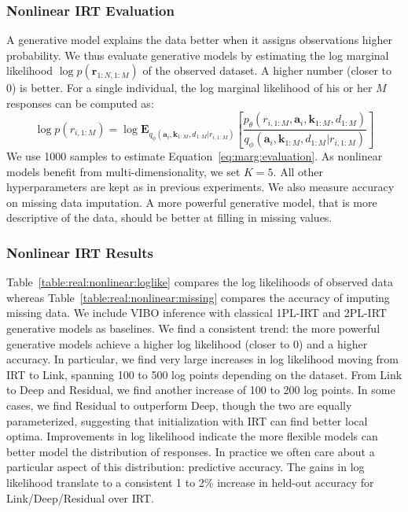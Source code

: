 \subsubsection{Nonlinear IRT Evaluation}

A generative model explains the data better when it assigns observations higher probability.
We thus evaluate generative models by estimating the log marginal likelihood $\log p(\textbf{r}_{1:N,1:M})$ of the observed dataset.
A higher number (closer to 0) is better.
For a single individual, the log marginal likelihood of his or her $M$ responses can be computed as:
\begin{equation}
    \log p({r}_{i,1:M}) = \log \mathbf{E}_{q_\phi(\textbf{a}_i, \textbf{k}_{1:M}, d_{1:M}|{r}_{i,1:M})}\left[ \frac{p_\theta({r}_{i,1:M}, \textbf{a}_i, \textbf{k}_{1:M}, d_{1:M})}{q_\phi(\textbf{a}_i, \textbf{k}_{1:M}, d_{1:M}|{r}_{i,1:M})} \right]
    \label{eq:marg:evaluation}
\end{equation}
We use 1000 samples to estimate Equation~\ref{eq:marg:evaluation}. 
As nonlinear models benefit from multi-dimensionality, we set $K=5$. All other hyperparameters are kept as in previous experiments.
We also measure accuracy on missing data imputation.
A more powerful generative model, that is more descriptive of the data, should be better at filling in missing values.

\subsubsection{Nonlinear IRT Results}
Table~\ref{table:real:nonlinear:loglike} compares the log likelihoods of observed data whereas Table~\ref{table:real:nonlinear:missing} compares the accuracy of imputing missing data.
We include VIBO inference with classical 1PL-IRT and 2PL-IRT generative models as baselines.
We find a consistent trend: the more powerful generative models achieve a higher log likelihood (closer to 0) and a higher accuracy.
In particular, we find very large increases in log likelihood moving from IRT to Link, spanning 100 to 500 log points depending on the dataset.
From Link to Deep and Residual, we find another increase of 100 to 200 log points.
In some cases, we find Residual to outperform Deep, though the two are equally parameterized, suggesting that initialization with IRT can find better local optima.
Improvements in log likelihood indicate the more flexible models can better model the distribution of responses.
In practice we often care about a particular aspect of this distribution: predictive accuracy.
The gains in log likelihood translate to a consistent 1 to 2\% increase in held-out accuracy for Link/Deep/Residual over IRT.

